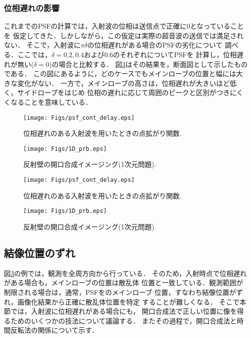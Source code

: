 \subsubsection{位相遅れの影響}
これまでのPSFの計算では，入射波の位相は送信点で正確に0となっていることを
仮定してきた．しかしながら，この仮定は実際の超音波の送信では満足されない．
そこで，入射波に$\pi \delta$の位相遅れがある場合のPSFの劣化について
調べる．ここでは，$\delta=0.2,0.4$および$0.6$のそれぞれについてPSFを
計算し，位相遅れが無い($\delta =0$)の場合と比較する．
図\ref{fig:XXX_psf_cont_delay}はその結果を，断面図として示したものである．
この図にあるように，どのケースでもメインローブの位置と幅には大きな変化がない．
一方で，メインローブの高さは，位相遅れが大きいほど低く，サイドローブをはじめ
位相の遅れに応じて周囲のピークと区別がつきにくくなることを意味している．
\begin{figure}[h]
	\begin{center}
	\texttt{[image: Figs/psf\_cont\_delay.eps]} 
	\end{center}
	\caption{位相遅れのある入射波を用いたときの点拡がり関数.} 
	\label{fig:XXX_psf_cont_delay}
\end{figure}
\begin{figure}[h]
	\begin{center}
	\texttt{[image: Figs/1D\_prb.eps]} 
	\end{center}
	\caption{反射壁の開口合成イメージング(1次元問題).} 
	\label{fig:XXX_1D_prb}
\end{figure}
\begin{figure}[h]
	\begin{center}
	\texttt{[image: Figs/psf\_cont\_delay.eps]} 
	\end{center}
	\caption{位相遅れのある入射波を用いたときの点拡がり関数.} 
	\label{fig:XXX_psf_cont_delay}
\end{figure}
\begin{figure}[h]
	\begin{center}
	\texttt{[image: Figs/1D\_prb.eps]} 
	\end{center}
	\caption{反射壁の開口合成イメージング(1次元問題).} 
	\label{fig:XXX_1D_prb}
\end{figure}
\subsection{結像位置のずれ}
図\ref{fig:XXX_psf_cont_delay}の例では，観測を全周方向から行っている．
そのため，入射時点で位相遅れがある場合も，メインローブの位置は散乱体
位置と一致している．観測範囲が制限される場合は，通常，PSFをのメインローブ
位置，すなわち結像位置がずれ，画像化結果から正確に散乱体位置を特定
することが難しくなる． そこで本節では，入射波に位相遅れがある場合にも，
開口合成法で正しい位置に像を得るためのいくつかの技法について議論する．
またその過程で，開口合成法と時間反転法の関係について示す．
